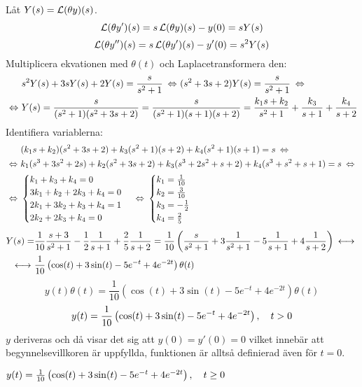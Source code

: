 \begin{task}{5.12}
	Låt $Y(s)=\operatorname{\mathcal{L}}(\theta y)(s)$.
	\[\operatorname{\mathcal{L}}(\theta y')(s)=s\operatorname{\mathcal{L}}(\theta y)(s)-y(0)=sY(s)\]
	\[\operatorname{\mathcal{L}}(\theta y'')(s)=s\operatorname{\mathcal{L}}(\theta y')(s)-y'(0)=s^2Y(s)\]
	Multiplicera ekvationen med $\theta(t)$ och Laplacetransformera den:
	\begin{align*}
	&s^2Y(s)+3sY(s)+2Y(s)=\frac{s}{s^2+1} \lra
	(s^2+3s+2)Y(s)=\frac{s}{s^2+1} \lra \\ \lra
	&Y(s)=\frac{s}{(s^2+1)(s^2+3s+2)}=
	\frac{s}{(s^2+1)(s+1)(s+2)}=
	\frac{k_1s+k_2}{s^2+1}+\frac{k_3}{s+1}+\frac{k_4}{s+2}
	\end{align*}
	Identifiera variablerna:
	\begin{align*}
	&(k_1s+k_2)(s^2+3s+2)+k_3(s^2+1)(s+2)+k_4(s^2+1)(s+1)=s \lra \\ \lra
	&k_1(s^3+3s^2+2s)+k_2(s^2+3s+2)+k_3(s^3+2s^2+s+2)+k_4(s^3+s^2+s+1)=s \lra \\ \lra
	&\begin{cases}
	k_1+k_3+k_4=0 \\
	3k_1+k_2+2k_3+k_4=0 \\
	2k_1+3k_2+k_3+k_4=1 \\
	2k_2+2k_3+k_4=0
	\end{cases} \lra
	\begin{cases}
	k_1=\frac{1}{10} \\
	k_2=\frac{3}{10} \\
	k_3=-\frac{1}{2} \\
	k_4=\frac{2}{5}
	\end{cases}
	\end{align*}
	\begin{align*}
	Y(s)=
	&\frac{1}{10}\*\frac{s+3}{s^2+1}-\frac{1}{2}\*\frac{1}{s+1}+\frac{2}{5}\*\frac{1}{s+2}=
	\frac{1}{10}\left(\frac{s}{s^2+1}+3\frac{1}{s^2+1}-5\frac{1}{s+1}+4\frac{1}{s+2}\right) \llra \\ \llra
	&\frac{1}{10}\left(\cos(t)+3\sin(t)-5e^{-t}+4e^{-2t}\right)\theta(t)
	\end{align*}
	\[y(t)\theta(t)=\frac{1}{10}\left(\cos(t)+3\sin(t)-5e^{-t}+4e^{-2t}\right)\theta(t)\]
	\[y(t)=\frac{1}{10}\left(\cos(t)+3\sin(t)-5e^{-t}+4e^{-2t}\right), \quad t>0\]
	$y$ deriveras och då visar det sig att $y(0)=y'(0)=0$ vilket innebär att begynnelsevillkoren är uppfyllda, funktionen är alltså definierad även för $t=0$.
	
	\ans $y(t)=\frac{1}{10}\left(\cos(t)+3\sin(t)-5e^{-t}+4e^{-2t}\right), \quad t\ge0$
\end{task}

